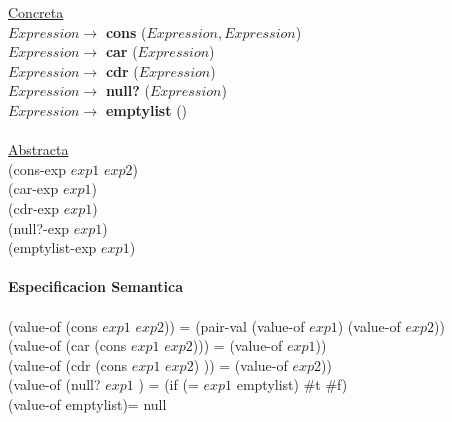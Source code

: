 \documentclass{article}
\begin{document}
\begin{itemize}
    \hspace*{10mm} \underline{Concreta}\\
    \hspace*{10mm}$Expression\rightarrow$ \textbf{cons} ($Expression,Expression$)\\
    \hspace*{10mm}$Expression\rightarrow$ \textbf{car} ($Expression$)\\
    \hspace*{10mm}$Expression\rightarrow$ \textbf{cdr} ($Expression$)\\
    \hspace*{10mm}$Expression\rightarrow$ \textbf{null?} ($Expression$)\\
    \hspace*{10mm}$Expression\rightarrow$ \textbf{emptylist} ()\\
    \\
    \hspace*{10mm} \underline{Abstracta}\\
    \hspace*{10mm}(cons-exp $exp1$ $exp2$)\\
    \hspace*{10mm}(car-exp $exp1$)\\
    \hspace*{10mm}(cdr-exp $exp1$)\\
    \hspace*{10mm}(null?-exp $exp1$)\\
    \hspace*{10mm}(emptylist-exp $exp1$)\\
    \\
    \textbf{Especificacion Semantica}\\
    \\
    {\small\hspace*{10mm}(value-of (cons $exp1$ $exp2$)) = (pair-val (value-of $exp1$) (value-of $exp2$))}\\
    \hspace*{10mm}(value-of (car (cons $exp1$ $exp2$))) = (value-of $exp1$))\\
    \hspace*{10mm}(value-of (cdr (cons $exp1$ $exp2$) )) = (value-of $exp2$))\\
    \hspace*{10mm}(value-of (null? $exp1$ ) = (if (= $exp1$ emptylist) \#t \#f)\\
    \hspace*{10mm}(value-of emptylist)= null\\

\end{itemize}
\end{document}
